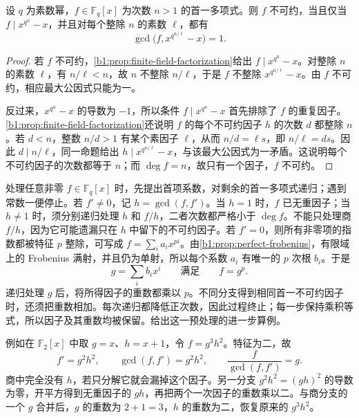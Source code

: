 \begin{proposition}[有限域上的不可约性检验]\label{b1:prop:finite-field-irreducibility-test}
	设 \(q\) 为素数幂，\(f\in\mathbb F_q[x]\) 为次数 \(n>1\) 的首一多项式。则 \(f\) 不可约，当且仅当 \(f\mid x^{q^n}-x\)，并且对每个整除 \(n\) 的素数 \(\ell\)，都有
	\[
		\gcd\bigl(f,x^{q^{n/\ell}}-x\bigr)=1.
	\]
\end{proposition}
\begin{proof}
	若 \(f\) 不可约，\cref{b1:prop:finite-field-factorization}给出 \(f\mid x^{q^n}-x\)。对整除 \(n\) 的素数 \(\ell\)，有 \(n/\ell<n\)，故 \(n\) 不整除 \(n/\ell\)，于是 \(f\) 不整除 \(x^{q^{n/\ell}}-x\)。由 \(f\) 不可约，相应最大公因式只能为一。

	反过来，\(x^{q^n}-x\) 的导数为 \(-1\)，所以条件 \(f\mid x^{q^n}-x\) 首先排除了 \(f\) 的重复因子。\cref{b1:prop:finite-field-factorization}还说明 \(f\) 的每个不可约因子 \(h\) 的次数 \(d\) 都整除 \(n\)。若 \(d<n\)，整数 \(n/d>1\) 有某个素因子 \(\ell\)，从而 \(n/d=\ell s\)，即 \(n/\ell=ds\)。因此 \(d\mid n/\ell\)，同一命题给出 \(h\mid x^{q^{n/\ell}}-x\)，与该最大公因式为一矛盾。这说明每个不可约因子的次数都等于 \(n\)；而 \(\deg f=n\)，故只有一个因子，\(f\) 不可约。
\end{proof}

处理任意非零 \(f\in\mathbb F_q[x]\) 时，先提出首项系数，对剩余的首一多项式递归；遇到常数一便停止。若 \(f'\ne0\)，记 \(h=\gcd(f,f')\)。当 \(h=1\) 时，\(f\) 已无重因子；当 \(h\ne1\) 时，须分别递归处理 \(h\) 和 \(f/h\)，二者次数都严格小于 \(\deg f\)。不能只处理商 \(f/h\)，因为它可能遗漏只在 \(h\) 中留下的不可约因子。若 \(f'=0\)，则所有非零项的指数都被特征 \(p\) 整除，可写成 \(f=\sum_i a_ix^{pi}\)。由\cref{b1:prop:perfect-frobenius}，有限域上的 Frobenius 满射，并且仍为单射，所以每个系数 \(a_i\) 有唯一的 \(p\) 次根 \(b_i\)。于是
\[
	g=\sum_i b_ix^i\qquad\text{满足}\qquad f=g^p.
\]
递归处理 \(g\) 后，将所得因子的重数都乘以 \(p\)。不同分支得到相同首一不可约因子时，还须把重数相加。每次递归都降低正次数，因此过程终止；每一步保持乘积等式，所以因子及其重数均被保留。给出这一预处理的进一步算例。

\ProseParagraphBreak
例如在 \(\mathbb F_2[x]\) 中取 \(g=x\)、\(h=x+1\)，令 \(f=g^3h^2\)。特征为二，故
\[
	f'=g^2h^2,\qquad \gcd(f,f')=g^2h^2,\qquad \frac{f}{\gcd(f,f')}=g.
\]
商中完全没有 \(h\)，若只分解它就会漏掉这个因子。另一分支 \(g^2h^2=(gh)^2\) 的导数为零，开平方得到无重因子的 \(gh\)，再把两个一次因子的重数乘以二。与商分支的一个 \(g\) 合并后，\(g\) 的重数为 \(2+1=3\)，\(h\) 的重数为二，恢复原来的 \(g^3h^2\)。

